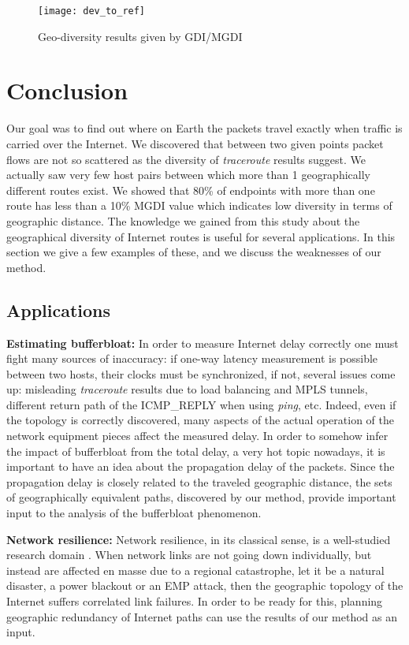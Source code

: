 \documentclass[peerreview]{IEEEtran}
\begin{document}
\begin{figure}[]
	\centering
	\texttt{[image: dev\_to\_ref]}
	\caption{Geo-diversity results given by GDI/MGDI}
	\label{fig:prod_ref}
\end{figure}

\section{Conclusion}
\label{sec:conclusion}

Our goal was to find out where on Earth the packets travel exactly when traffic
is carried over the Internet. We discovered that between two given points packet
flows are not so scattered as the diversity of \textit{traceroute} results
suggest. We actually saw very few host pairs between which more than 1
geographically different routes exist. We showed that 80\% of endpoints with
more than one route has less than a 10\% MGDI value which indicates low
diversity in terms of geographic distance. The knowledge we gained from this
study about the geographical diversity of Internet routes is useful for several
applications. In this section we give a few examples of these, and we discuss
the weaknesses of our method.

\subsection{Applications}
\label{sec:applications}
\textbf{Estimating bufferbloat:} In order to measure Internet delay correctly
one must fight many sources of inaccuracy: if one-way latency measurement is
possible between two hosts, their clocks must be synchronized, if not, several
issues come up: misleading \textit{traceroute} results due to load balancing and
MPLS tunnels, different return path of the ICMP\_REPLY when using \textit{ping},
etc. Indeed, even if the topology is correctly discovered, many aspects of the
actual operation of the network equipment pieces affect the measured delay. In
order to somehow infer the impact of bufferbloat from the total delay, a very
hot topic nowadays, it is important to have an idea about the propagation delay
of the packets. Since the propagation delay is closely related to the traveled
geographic distance, the sets of geographically equivalent paths, discovered by
our method, provide important input to the analysis of the bufferbloat
phenomenon.

\textbf{Network resilience:} Network resilience, in its classical sense, is a
well-studied research domain \cite{najjar1990network}. When network links are
not going down individually, but instead are affected en masse due to a regional
catastrophe, let it be a natural disaster, a power blackout or an EMP attack,
then the geographic topology of the Internet suffers correlated link failures.
In order to be ready for this, planning geographic redundancy of Internet paths
can use the results of our method as an input.
\end{document}
